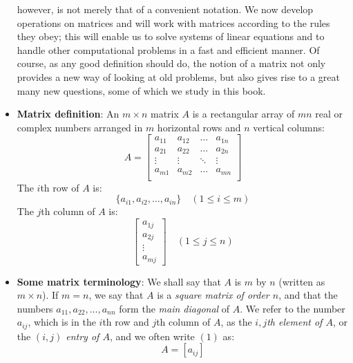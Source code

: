 \documentclass{report}
\begin{document}
\begin{itemize}
             however, is not merely that of a convenient notation. We now develop operations 
             on matrices and will work with matrices according to the rules they obey; this will 
             enable us to solve systems of linear equations and to handle other computational 
             problems in a fast and efficient manner. Of course, as any good definition should 
             do, the notion of a matrix not only provides a new way of looking at old problems, 
             but also gives rise to a great many new questions, some of which we study in this 
             book.
         \item \textbf{Matrix definition}:
             An $m \times n$ matrix $A$ is a rectangular array of $mn$ real or complex numbers arranged in $m$ horizontal rows and $n$ vertical columns:
             \[
                 A = \begin{bmatrix}
                     a_{11} & a_{12} & \dots & a_{1n} \\
                     a_{21} & a_{22} & \dots & a_{2n} \\
                     \vdots & \vdots & \ddots & \vdots \\
                     a_{m1} & a_{m2} & \dots & a_{mn} \\
                 \end{bmatrix}
             \]
             The $i$th row of $A$ is:
             \[
                 \{a_{i1}, a_{i2}, \dots, a_{in}\} \quad (1 \leq i \leq m)
             \]
             The $j$th column of $A$ is:
             \[
                 \begin{bmatrix}
                     a_{1j} \\
                     a_{2j} \\
                     \vdots \\
                     a_{mj}
                 \end{bmatrix} \quad (1 \leq j \leq n)
             \]
         \item \textbf{Some matrix terminology}:
             We shall say that $A$ is $m$ by $n$ (written as $m \times n$). If $m = n$, we say that $A$ is a \textit{square matrix of order $n$}, and that the numbers $a_{11}, a_{22}, \dots, a_{nn}$ form the \textit{main diagonal} of $A$. We refer to the number $a_{ij}$, which is in the $i$th row and $j$th column of $A$, as the \textit{$i,j$th element of $A$}, or the \textit{$(i,j)$ entry of $A$}, and we often write $(1)$ as:
             \[
                 A = [a_{ij}]
             \]

\end{itemize}
\end{document}
